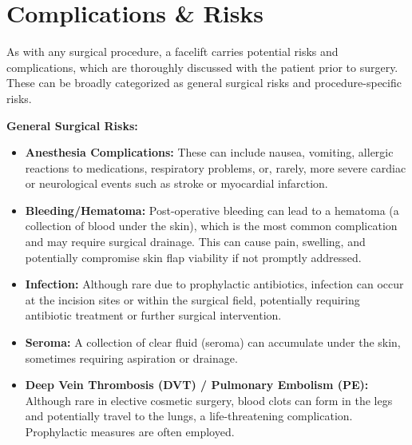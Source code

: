 \section*{Complications \& Risks}
As with any surgical procedure, a facelift carries potential risks and complications, which are thoroughly discussed with the patient prior to surgery. These can be broadly categorized as general surgical risks and procedure-specific risks.

\textbf{General Surgical Risks:}
\begin{itemize}
  \item \textbf{Anesthesia Complications:} These can include nausea, vomiting, allergic reactions to medications, respiratory problems, or, rarely, more severe cardiac or neurological events such as stroke or myocardial infarction.
  \item \textbf{Bleeding/Hematoma:} Post-operative bleeding can lead to a hematoma (a collection of blood under the skin), which is the most common complication and may require surgical drainage. This can cause pain, swelling, and potentially compromise skin flap viability if not promptly addressed.
  \item \textbf{Infection:} Although rare due to prophylactic antibiotics, infection can occur at the incision sites or within the surgical field, potentially requiring antibiotic treatment or further surgical intervention.
  \item \textbf{Seroma:} A collection of clear fluid (seroma) can accumulate under the skin, sometimes requiring aspiration or drainage.
  \item \textbf{Deep Vein Thrombosis (DVT) / Pulmonary Embolism (PE):} Although rare in elective cosmetic surgery, blood clots can form in the legs and potentially travel to the lungs, a life-threatening complication. Prophylactic measures are often employed.
\end{itemize}

